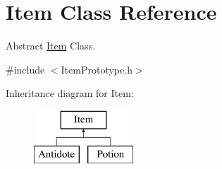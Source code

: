 \hypertarget{class_item}{}\section{Item Class Reference}
\label{class_item}


Abstract \hyperlink{class_item}{Item} Class.  




{\ttfamily \#include $<$Item\+Prototype.\+h$>$}

Inheritance diagram for Item\+:\begin{figure}[H]
\begin{center}
\leavevmode
\includegraphics[height=2.000000cm]{class_item}
\end{center}
\end{figure}
